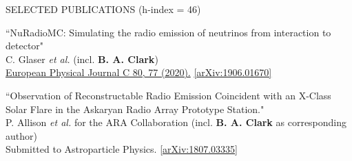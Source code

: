 \documentclass{resume} %
\begin{document}
\begin{rSection}{SELECTED PUBLICATIONS (h-index = 46)}
\begin{etaremune}

  \item ``NuRadioMC: Simulating the radio emission of neutrinos from interaction to detector" \\
 C. Glaser {\it et al.} (incl. \textbf{B. A. Clark})\\     \href{https://doi.org/10.1140/epjc/s10052-020-7612-8}{European Physical Journal C 80, 77 (2020).} \href{https://arxiv.org/abs/1906.01670}{[arXiv:1906.01670]}
 

 

 \item ``Observation of Reconstructable Radio Emission Coincident with an X-Class Solar Flare in the Askaryan Radio Array Prototype Station." \\
P. Allison {\it et al.} for the ARA Collaboration (incl. \textbf{B. A. Clark} as corresponding author) \\
 Submitted to Astroparticle Physics. \href{https://arxiv.org/abs/1807.03335}{[arXiv:1807.03335]}
 


\end{etaremune}
\end{rSection}
\end{document}
